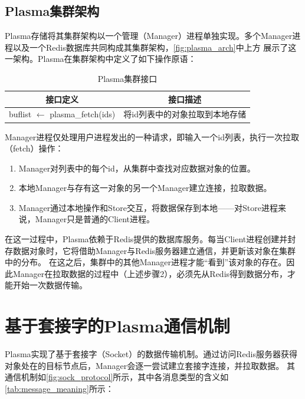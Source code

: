 \subsection{Plasma集群架构}
\label{sec:plasma_cluster}

Plasma存储将其集群架构以一个管理（Manager）进程单独实现。多个Manager进程以及一个Redis数据库共同构成其集群架构，\autoref{fig:plasma_arch}中上方
展示了这一架构。Plasma在集群架构中定义了如下操作原语：

\begin{table}[h]
    \centering
    \caption{Plasma集群接口}
    \begin{tabular}{*{2}{c}}
        \toprule
        接口定义 & 接口描述      \\
        \midrule
        buflist $\leftarrow$ plasma\_fetch(ids)               & 将id列表中的对象拉取到本地存储   \\
        \bottomrule
    \end{tabular}
    \label{tab:manager_api}
\end{table}

Manager进程仅处理用户进程发出的一种请求，即输入一个id列表，执行一次拉取（fetch）操作：

\begin{enumerate}
    \item Manager对列表中的每个id，从集群中查找对应数据对象的位置。 
    \item 本地Manager与存有这一对象的另一个Manager建立连接，拉取数据。
    \item Manager通过本地操作和Store交互，将数据保存到本地——对Store进程来说，Manager只是普通的Client进程。
\end{enumerate}

在这一过程中，Plasma依赖于Redis提供的数据库服务。每当Client进程创建并封存数据对象时，它将借助Manager与Redis服务器建立通信，并更新该对象在集群中的分布。
在这之后，集群中的其他Manager进程才能“看到”该对象的存在。因此Manager在拉取数据的过程中（上述步骤2），必须先从Redis得到数据分布，才能开始一次数据传输。

\section{基于套接字的Plasma通信机制}

Plasma实现了基于套接字（Socket）的数据传输机制。通过访问Redis服务器获得对象处在的目标节点后，Manager会逐一尝试建立套接字连接，并拉取数据。
其通信机制如\autoref{fig:sock_protocol}所示，其中各消息类型的含义如\autoref{tab:message_meaning}所示：

